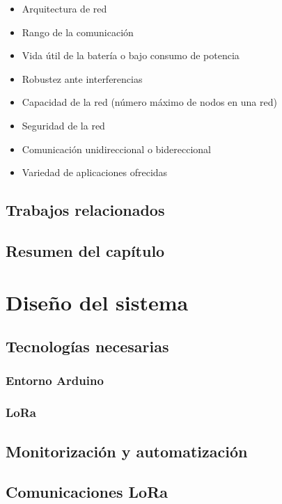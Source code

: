 \documentclass[12pt]{article}
\begin{document}
	\begin{itemize}
		\item Arquitectura de red
		\item Rango de la comunicación
		\item Vida útil de la batería o bajo consumo de potencia 
		\item Robustez ante interferencias
		\item Capacidad de la red (número máximo de nodos en una red)
		\item Seguridad de la red
		\item Comunicación unidireccional o bidereccional
		\item Variedad de aplicaciones ofrecidas
	\end{itemize}

	\subsection[Trabajos relacionados]{Trabajos relacionados}
	\subsection[Resumen del capítulo]{Resumen del capítulo}
	
	\pagebreak
	
	\section[Diseño del sistema]{Diseño del sistema}
	\subsection[Tecnologías necesarias]{Tecnologías necesarias}
	\subsubsection[Entorno Arduino]{Entorno Arduino}
	\subsubsection[LoRa]{LoRa}
	\subsection[Monitorización y automatización]{Monitorización y automatización}
	\subsection[Comunicaciones LoRa]{Comunicaciones LoRa}
\end{document}

